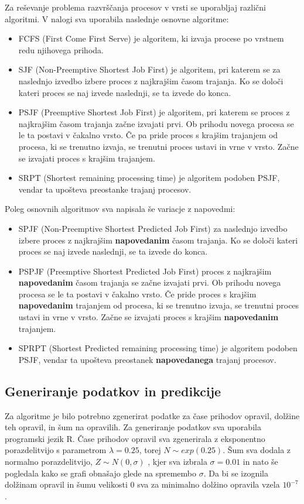 \documentclass[a4paper, pt14]{article}
\begin{document}
Za reševanje problema razvrščanja procesov v vrsti se uporabljaj različni algoritmi. V nalogi sva uporabila naslednje osnovne algoritme:
\begin{itemize}
  \item FCFS (First Come First Serve) je algoritem, ki izvaja procese po vrstnem redu njihovega prihoda.
  \item SJF (Non-Preemptive Shortest Job First) je algoritem, pri katerem se za naslednjo izvedbo izbere proces z najkrajšim časom trajanja. Ko se določi kateri proces se naj izvede naslednji, se ta izvede do konca. 
  \item PSJF (Preemptive Shortest Job First) je algoritem, pri katerem se proces z najkrajšim časom trajanja začne izvajati prvi. Ob prihodu novega procesa se le ta postavi v čakalno vrsto. Če pa pride proces s krajšim trajanjem od procesa, ki se trenutno izvaja, se trenutni proces ustavi in vrne v vrsto. Začne se izvajati proces s krajšim trajanjem.
  \item SRPT (Shortest remaining processing time) je algoritem podoben PSJF, vendar ta upošteva preostanke trajanj procesov.
\end{itemize}

Poleg osnovnih algoritmov sva napisala še variacje z napovedmi:

\begin{itemize}
  \item SPJF (Non-Preemptive Shortest Predicted Job First) za naslednjo izvedbo izbere proces z najkrajšim \textbf{napovedanim} časom trajanja. Ko se določi kateri proces se naj izvede naslednji, se ta izvede do konca. 
  \item PSPJF (Preemptive Shortest Predicted Job First) proces z najkrajšim \textbf{napovedanim} časom trajanja se začne izvajati prvi. Ob prihodu novega procesa se le ta postavi v čakalno vrsto. Če pride proces s krajšim \textbf{napovedanim} trajanjem od procesa, ki se trenutno izvaja, se trenutni proces ustavi in vrne v vrsto. Začne se izvajati proces s krajšim \textbf{napovedanim} trajanjem.
  \item SPRPT (Shortest Predicted remaining processing time) je algoritem podoben PSJF, vendar ta upošteva preostanek \textbf{napovedanega} trajanj procesov.
\end{itemize}



\subsection{Generiranje podatkov in predikcije}
Za algoritme je bilo potrebno zgenerirat podatke za \v case prihodov opravil, dol\v zine teh opravil, in \v sum na opravilih. Za generiranje podatkov sva uporabila programski jezik R. \v Case prihodov opravil sva zgenerirala z eksponentno porazdelitvijo s parametrom $\lambda = 0.25$, torej $N \sim exp(0.25) $. \v Sum sva dodala z normalno porazdelitvijo, $ Z \sim N(0,\sigma) $ , kjer sva izbrala $\sigma = 0.01$ in nato \v se pogledala kako se grafi obna\v sajo glede na spremembo $\sigma$. Da bi se izognila dolžinam opravil in \v sumu velikosti 0 sva za minimalno dol\v zino opravila vzela $10^{-7}$.
\end{document}
